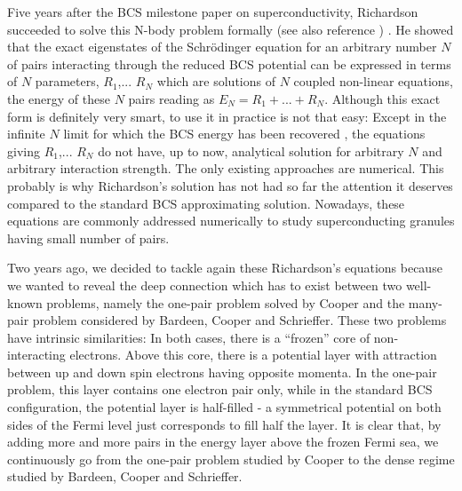 \documentclass[epj]{svjour}
\begin{document}
Five years after the BCS milestone paper\cite{BCS} on superconductivity, Richardson succeeded to solve this N-body problem formally\cite{Richardson1,Richardson2,Richardson1968,Richardson3} (see also reference \cite{gaudin,Ushveridze}) . He showed that 
the exact eigenstates of the Schr\"{o}dinger equation for an arbitrary number $N$ of pairs interacting through the reduced BCS potential can be expressed in terms
of $N$ parameters, $R_{1}$,... $R_{N}$ which are solutions of $N$ coupled
non-linear equations, the energy of these $N$ pairs reading as $E
_{N}=R_{1}+...+R_{N}$. Although this exact form is definitely very smart, to
use it in practice is not that easy: Except in the infinite $N$ limit for which the BCS energy has been recovered \cite{Richardson3}, the equations giving $R_{1}$,... $R_{N}$  do not have, up to now, analytical solution for arbitrary $N$ and arbitrary interaction strength. The only existing approaches are numerical\cite{Duk,ortiz,delft}. This probably is why Richardson's solution has not had so far the
attention it deserves compared to the standard BCS approximating solution. Nowadays, these equations 
are commonly addressed numerically to study superconducting granules having small number of pairs\cite{Duk,delft2001,sierra2000,schechter2001}. 

Two years ago, we decided to tackle again these Richardson's equations because we wanted to reveal the deep connection which has to exist between two well-known problems, namely the
one-pair problem solved by Cooper and the many-pair problem considered by Bardeen, Cooper and Schrieffer. 
These two problems have intrinsic similarities: In
both cases, there is a ``frozen'' core of non-interacting electrons. Above this core, there is
a potential layer with attraction between up and
down spin electrons having opposite momenta. In the one-pair problem, this layer contains one electron pair 
only, while in the standard BCS configuration, the potential
layer is half-filled - a symmetrical potential 
on both sides of the Fermi level just corresponds to fill half the layer.
It is clear that, by adding more and more pairs in the energy layer above  the frozen Fermi sea, we continuously go from the one-pair problem studied by Cooper to the dense regime studied by Bardeen, Cooper and Schrieffer. 
\end{document}
